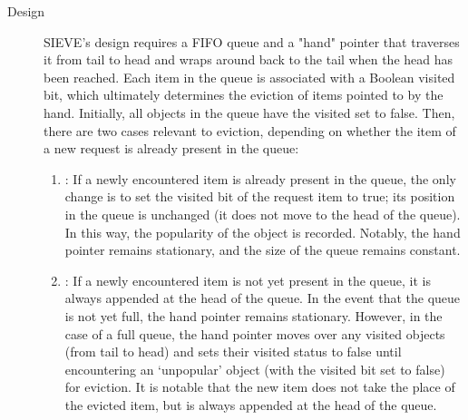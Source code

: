 \begin{description}
    \item[Design] 
    
    SIEVE's design requires a FIFO queue and a "hand" pointer that traverses it from tail to head and wraps around back to the tail when the head has been reached. Each item in the queue is associated with a Boolean visited bit, which ultimately determines the eviction of items pointed to by the hand. Initially, all objects in the queue have the visited set to false. Then, there are two cases relevant to eviction, depending on whether the item of a new request is already present in the queue:

    \begin{enumerate}[label=(\arabic*)]
        \item {}: If a newly encountered item is already present in the queue, the only change is to set the visited bit of the request item to true; its position in the queue is unchanged (it does not move to the head of the queue). In this way, the popularity of the object is recorded. Notably, the hand pointer remains stationary, and the size of the queue remains constant.
        \item {}: If a newly encountered item is not yet present in the queue, it is always appended at the head of the queue. In the event that the queue is not yet full, the hand pointer remains stationary. However, in the case of a full queue, the hand pointer moves over any visited objects (from tail to head) and sets their visited status to false until encountering an `unpopular' object (with the visited bit set to false) for eviction. It is notable that the new item does not take the place of the evicted item, but is always appended at the head of the queue. 
    \end{enumerate}
\end{description}


